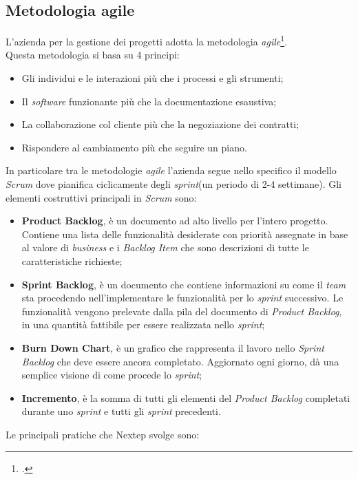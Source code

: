 \subsection{Metodologia agile}
L'azienda per la gestione dei progetti adotta la metodologia \emph{agile}\footcite{http://www.agilemanifesto.org/}.\\Questa metodologia si basa su 4 principi:
\begin{itemize}
\item Gli individui e le interazioni più che i processi e gli strumenti;
\item Il \emph{software} funzionante più che la documentazione esaustiva;
\item La collaborazione col cliente più che la negoziazione dei contratti;
\item Rispondere al cambiamento più che seguire un piano.
\end{itemize}
In particolare tra le metodologie \emph{agile} l'azienda segue nello specifico il modello \emph{Scrum} dove pianifica ciclicamente degli \emph{sprint}(un periodo di 2-4 settimane).
\newpage
Gli elementi costruttivi principali in \emph{Scrum} sono:
\begin{itemize}
\item \textbf{Product Backlog}, è un documento ad alto livello per l'intero progetto. Contiene una lista delle funzionalità desiderate con priorità assegnate in base al valore di \emph{business} e  i \emph{Backlog Item} che sono descrizioni di tutte le caratteristiche richieste;
\item \textbf{Sprint Backlog}, è un documento che contiene informazioni su come il \emph{team} sta procedendo nell'implementare le funzionalità per lo \emph{sprint} successivo. Le funzionalità vengono prelevate dalla pila del documento di \emph{Product Backlog}, in una quantità fattibile per essere realizzata nello \emph{sprint};
\item \textbf{Burn Down Chart}, è un grafico che rappresenta il lavoro nello \emph{Sprint Backlog} che deve essere ancora completato. Aggiornato ogni giorno, dà una semplice visione di come procede lo \emph{sprint};
\item \textbf{Incremento}, è la somma di tutti gli elementi del \emph{Product Backlog} completati durante uno \emph{sprint} e tutti gli \emph{sprint} precedenti.
\end{itemize}
Le principali pratiche che Nextep svolge sono:

